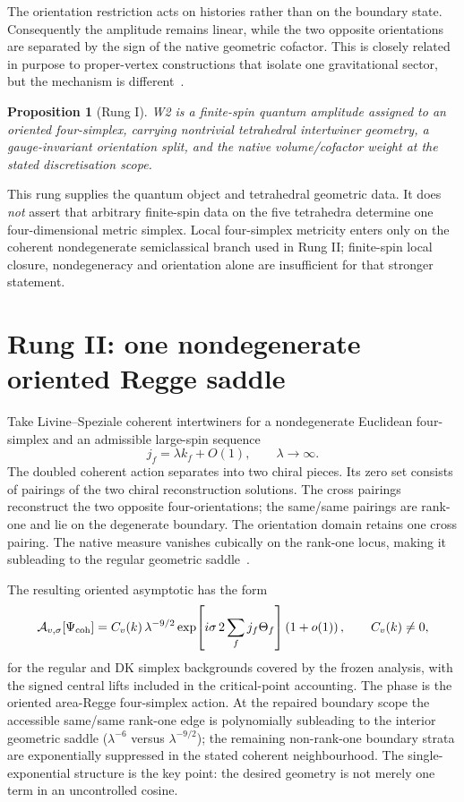 \documentclass[11pt]{article}
\numberwithin{equation}{section}
\newtheorem{proposition}[theorem]{Proposition}
\begin{document}
The orientation restriction acts on histories rather than on the boundary state. Consequently the amplitude remains linear, while the two opposite orientations are separated by the sign of the native geometric cofactor. This is closely related in purpose to proper-vertex constructions that isolate one gravitational sector, but the mechanism is different~\cite{Engle2013}.

\begin{proposition}[Rung I]
W2 is a finite-spin quantum amplitude assigned to an oriented four-simplex, carrying nontrivial tetrahedral intertwiner geometry, a gauge-invariant orientation split, and the native volume/cofactor weight at the stated discretisation scope.
\end{proposition}

This rung supplies the quantum object and tetrahedral geometric data. It does \emph{not} assert that arbitrary finite-spin data on the five tetrahedra determine one four-dimensional metric simplex. Local four-simplex metricity enters only on the coherent nondegenerate semiclassical branch used in Rung II; finite-spin local closure, nondegeneracy and orientation alone are insufficient for that stronger statement.

\section{Rung II: one nondegenerate oriented Regge saddle}\label{sec:r2}

Take Livine--Speziale coherent intertwiners for a nondegenerate Euclidean four-simplex and an admissible large-spin sequence
\begin{equation}
  j_f=\lambda k_f+O(1),\qquad \lambda\to\infty.
\end{equation}
The doubled coherent action separates into two chiral pieces. Its zero set consists of pairings of the two chiral reconstruction solutions. The cross pairings reconstruct the two opposite four-orientations; the same/same pairings are rank-one and lie on the degenerate boundary. The orientation domain retains one cross pairing. The native measure vanishes cubically on the rank-one locus, making it subleading to the regular geometric saddle~\cite{W2asym,BarrettEtAl2009,BFH2009}.

The resulting oriented asymptotic has the form
\begin{equation}\label{eq:reggeasym}
  \mathcal A_{v,\sigma}[\Psi_{\rm coh}]
  = C_v(k)\,\lambda^{-9/2}
  \exp\!\left[i\sigma\,2\sum_f j_f\Theta_f\right]
  \left(1+o(1)\right),
  \qquad C_v(k)\neq0,
\end{equation}
for the regular and DK simplex backgrounds covered by the frozen analysis, with the signed central lifts included in the critical-point accounting. The phase is the oriented area-Regge four-simplex action. At the repaired boundary scope the accessible same/same rank-one edge is polynomially subleading to the interior geometric saddle ($\lambda^{-6}$ versus $\lambda^{-9/2}$); the remaining non-rank-one boundary strata are exponentially suppressed in the stated coherent neighbourhood. The single-exponential structure is the key point: the desired geometry is not merely one term in an uncontrolled cosine.
\end{document}
